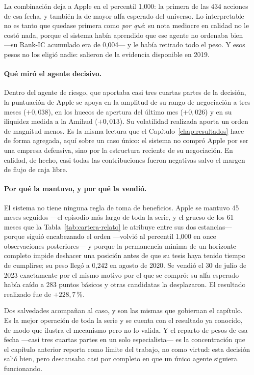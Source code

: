 La combinación deja a Apple en el percentil 1,000: la primera de las 434 acciones de esa fecha, y
también la de mayor alfa esperado del universo. Lo interpretable no es tanto que quedase primera
como \emph{por qué}: su nota mediocre en calidad no le costó nada, porque el sistema había aprendido
que ese agente no ordenaba bien ---su Rank-IC acumulado era de 0,004--- y le había retirado todo el
peso. Y esos pesos no los eligió nadie: salieron de la evidencia disponible en 2019.

\paragraph{Qué miró el agente decisivo.} Dentro del agente de riesgo, que aportaba casi tres cuartas
partes de la decisión, la puntuación de Apple se apoya en la amplitud de su rango de negociación a
tres meses ($+0{,}038$), en los huecos de apertura del último mes ($+0{,}026$) y en su iliquidez
medida a la Amihud ($+0{,}013$). Su volatilidad realizada aporta un orden de magnitud menos. Es la
misma lectura que el Capítulo~\ref{chap:resultados} hace de forma agregada, aquí sobre un caso
único: el sistema no compró Apple por ser una empresa defensiva, sino por la estructura reciente de
su negociación. En calidad, de hecho, casi todas las contribuciones fueron negativas salvo el margen
de flujo de caja libre.

\paragraph{Por qué la mantuvo, y por qué la vendió.} El sistema no tiene ninguna regla de toma de
beneficios. Apple se mantuvo 45 meses seguidos ---el episodio más largo de toda la serie, y el grueso
de los 61 meses que la Tabla~\ref{tab:cartera-relato} le atribuye entre sus dos estancias--- porque siguió
encabezando el orden ---volvió al percentil
1,000 en once observaciones posteriores--- y porque la permanencia mínima de un horizonte completo
impide deshacer una posición antes de que su tesis haya tenido tiempo de cumplirse; su peso llegó a
0,242 en agosto de 2020. Se vendió el 30 de julio de 2023 exactamente por el mismo motivo por el que
se compró: su alfa esperado había caído a 283 puntos básicos y otras candidatas la desplazaron. El
resultado realizado fue de $+228{,}7$\,\%.

Dos salvedades acompañan al caso, y son las mismas que gobiernan el capítulo. Es la mejor operación
de toda la serie y se cuenta con el resultado ya conocido, de modo que ilustra el mecanismo pero no
lo valida. Y el reparto de pesos de esa fecha ---casi tres cuartas partes en un solo especialista---
es la concentración que el capítulo anterior reporta como límite del trabajo, no como virtud: esta
decisión salió bien, pero descansaba casi por completo en que un único agente siguiera funcionando.

